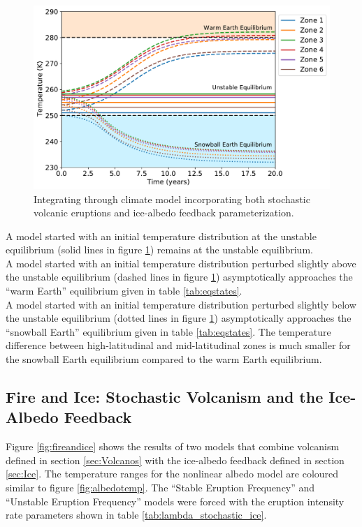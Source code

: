 \documentclass[12pt]{article}
\begin{document}
\begin{figure}[H]
    \centering
    \includegraphics[scale=0.6]{albedo_equilibria_1plot.pdf}
    \caption{
        Integrating through climate model incorporating both stochastic volcanic
        eruptions and ice-albedo feedback parameterization.
    }
    \label{fig:albedo_equil}
\end{figure}
\FloatBarrier

A model started with an initial temperature distribution at the unstable equilibrium
(solid lines in figure \ref{fig:albedo_equil}) remains at the unstable equilibrium. \\

A model started with an initial temperature distribution perturbed slightly above
the unstable equilibrium (dashed lines in figure \ref{fig:albedo_equil}) asymptotically
approaches the ``warm Earth'' equilibrium given in table \ref{tab:eqstates}. \\

A model started with an initial temperature distribution perturbed slightly below
the unstable equilibrium (dotted lines in figure \ref{fig:albedo_equil}) asymptotically
approaches the ``snowball Earth'' equilibrium given in table \ref{tab:eqstates}.
The temperature difference between high-latitudinal and mid-latitudinal zones is much
smaller for the snowball Earth equilibrium compared to the warm Earth equilibrium.

\subsection{Fire and Ice: Stochastic Volcanism and the Ice-Albedo Feedback}
Figure \ref{fig:fireandice} shows the results of two models that combine
volcanism defined in section \ref{sec:Volcanos} with the ice-albedo feedback
defined in section \ref{sec:Ice}. The temperature ranges for the nonlinear albedo model
are coloured similar to figure \ref{fig:albedotemp}. The ``Stable Eruption Frequency'' and
``Unstable Eruption Frequency'' models were forced with the eruption intensity
rate parameters shown in table \ref{tab:lambda_stochastic_ice}.
\end{document}
